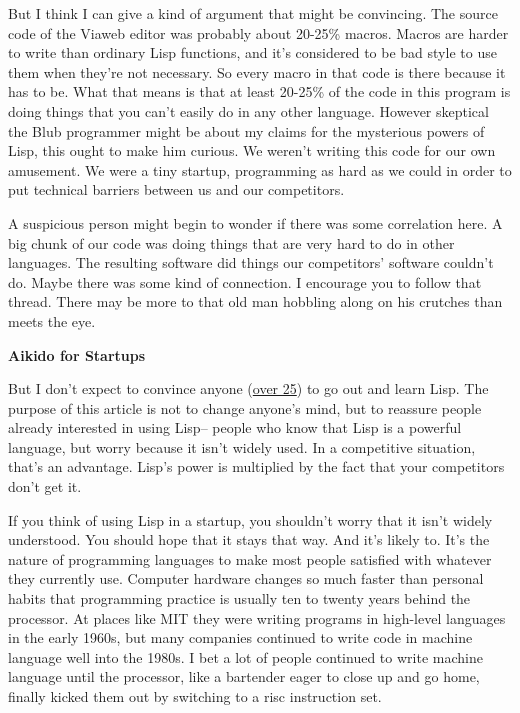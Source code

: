 But I think I can give a kind of argument that might be convincing. The
source code of the Viaweb editor was probably about 20-25\% macros.
Macros are harder to write than ordinary Lisp functions, and it's
considered to be bad style to use them when they're not necessary. So
every macro in that code is there because it has to be. What that means
is that at least 20-25\% of the code in this program is doing things
that you can't easily do in any other language. However skeptical the
Blub programmer might be about my claims for the mysterious powers of
Lisp, this ought to make him curious. We weren't writing this code for
our own amusement. We were a tiny startup, programming as hard as we
could in order to put technical barriers between us and our competitors.

A suspicious person might begin to wonder if there was some correlation
here. A big chunk of our code was doing things that are very hard to do
in other languages. The resulting software did things our competitors'
software couldn't do. Maybe there was some kind of connection. I
encourage you to follow that thread. There may be more to that old man
hobbling along on his crutches than meets the eye.

\textbf{Aikido for Startups}

But I don't expect to convince anyone
(\href{http://www.trollope.org/scheme.html}{over 25}) to go out and
learn Lisp. The purpose of this article is not to change anyone's mind,
but to reassure people already interested in using Lisp-- people who
know that Lisp is a powerful language, but worry because it isn't widely
used. In a competitive situation, that's an advantage. Lisp's power is
multiplied by the fact that your competitors don't get it.

If you think of using Lisp in a startup, you shouldn't worry that it
isn't widely understood. You should hope that it stays that way. And
it's likely to. It's the nature of programming languages to make most
people satisfied with whatever they currently use. Computer hardware
changes so much faster than personal habits that programming practice is
usually ten to twenty years behind the processor. At places like MIT
they were writing programs in high-level languages in the early 1960s,
but many companies continued to write code in machine language well into
the 1980s. I bet a lot of people continued to write machine language
until the processor, like a bartender eager to close up and go home,
finally kicked them out by switching to a risc instruction set.

